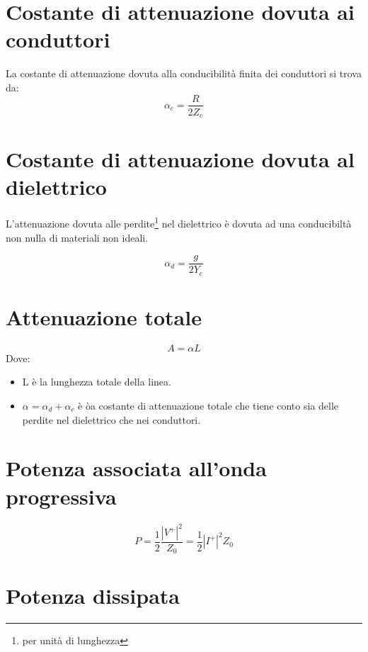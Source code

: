 \documentclass[10pt,a4paper]{report}
\begin{document}




	\section{Costante di attenuazione dovuta ai conduttori}
	
			La costante di attenuazione dovuta alla conducibilità finita dei conduttori si trova da:
			\begin{equation}
			\alpha_c=\frac{R}{2Z_c}
			\end{equation}
		
	\section{Costante di attenuazione dovuta al dielettrico}
	
			L'attenuazione dovuta alle perdite\footnote{per unità di lunghezza} nel dielettrico è dovuta ad una conducibiltà non nulla di materiali non ideali.

			\begin{equation}
			\alpha_d=\frac{g}{2Y_c}
			\end{equation}

	\section{Attenuazione totale}

			\begin{equation}
			A=\alpha L
			\end{equation}
			Dove:
			\begin{itemize}
			\item L è la lunghezza totale della linea.
			\item $\alpha=\alpha_d+\alpha_c$ è òa costante di attenuazione totale che tiene conto sia delle perdite nel dielettrico che nei conduttori.
			\end{itemize}


	\section{Potenza associata all'onda progressiva}

			\begin{equation}
			P=\frac{1}{2}\frac{|V^+|^2}{Z_0}=\frac{1}{2}|I^+|^2 Z_0
			\end{equation}

	\section{Potenza dissipata}
\end{document}
